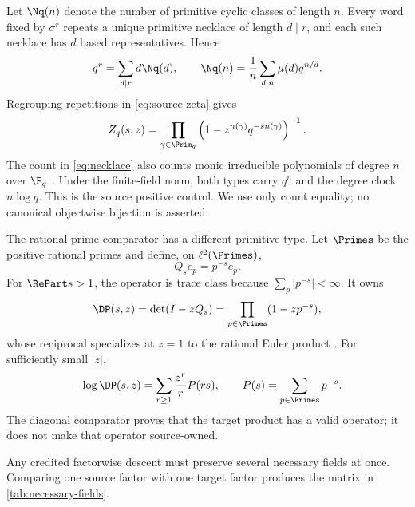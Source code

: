 Let $\Nq(n)$ denote the number of primitive cyclic classes of length $n$.
Every word fixed by $\sigma^r$ repeats a unique primitive necklace of length
$d\mid r$, and each such necklace has $d$ based representatives. Hence
\begin{equation}
 q^r=\sum_{d\mid r}d\Nq(d),
 \qquad
 \Nq(n)=\frac1n\sum_{d\mid n}\mu(d)q^{n/d}.                 \label{eq:necklace}
\end{equation}
Regrouping repetitions in \cref{eq:source-zeta} gives
\begin{equation}
 Z_q(s,z)=\prod_{\gamma\in\Prim_q}
 \left(1-z^{n(\gamma)}q^{-s n(\gamma)}\right)^{-1}.          \label{eq:source-product}
\end{equation}
The count in \cref{eq:necklace} also counts monic irreducible polynomials of
degree $n$ over $\F_q$ \citep{chebolu2026necklace}. Under the finite-field
norm, both types carry $q^n$ and the degree clock $n\log q$. This is the
source positive control. We use only count equality; no canonical objectwise
bijection is asserted.

The rational-prime comparator has a different primitive type. Let $\Primes$
be the positive rational primes and define, on $\ell^2(\Primes)$,
\[
 Q_se_p=p^{-s}e_p.
\]
For $\RePart s>1$, the operator is trace class because
$\sum_p|p^{-s}|<\infty$. It owns
\begin{equation}
 \DP(s,z)=\det(I-zQ_s)
 =\prod_{p\in\Primes}(1-zp^{-s}),                             \label{eq:target-det}
\end{equation}
whose reciprocal specializes at $z=1$ to the rational Euler product
\citep{nistDLMF25211}. For sufficiently small $|z|$,
\begin{equation}
 -\log\DP(s,z)
 =\sum_{r\ge1}\frac{z^r}{r}P(rs),
 \qquad
 P(s)=\sum_{p\in\Primes}p^{-s}.                              \label{eq:target-log}
\end{equation}
The diagonal comparator proves that the target product has a valid operator;
it does not make that operator source-owned.

Any credited factorwise descent must preserve several necessary fields at
once. Comparing one source factor with one target factor produces the matrix
in \cref{tab:necessary-fields}.

